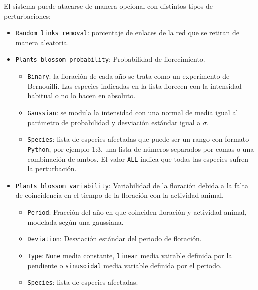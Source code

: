 El sistema puede atacarse de manera opcional con distintos tipos de perturbaciones:
\begin{itemize}
\item \texttt{Random links removal}: porcentaje de enlaces de la red que se retiran de manera aleatoria.

\item \texttt{Plants blossom probability}: Probabilidad de florecimiento. 

\begin{itemize}
	\item \texttt{Binary}: la floración de cada año se trata como un experimento de Bernouilli. Las especies indicadas en la lista florecen con la intensidad habitual o no lo hacen en absoluto.

    \item \texttt{Gaussian}: se modula la intensidad con una normal de media igual al parámetro de probabilidad y desviación estándar igual a $\sigma$.
    
    \item \texttt{Species}: lista de especies afectadas que puede ser un rango con formato \texttt{Python}, por ejemplo 1:3, una lista de números separados por comas o una combinación de ambos. El valor \texttt{ALL} indica que todas las especies sufren la perturbación.
\end{itemize}

\item \texttt{Plants blossom variability}: Variabilidad de la floración debida a la falta de coincidencia en el tiempo de la floración con la actividad animal.
\begin{itemize}
	\item \texttt{Period}: Fracción del año en que coinciden floración y actividad animal, modelada según una gaussiana.

    \item \texttt{Deviation}: Desviación estándar del periodo de floración.
    
    \item \texttt{Type}:  \texttt{None} media constante, \texttt{linear} media vairable definida por la pendiente o \texttt{sinusoidal} media variable definida por el periodo.
    
    \item \texttt{Species}: lista de especies afectadas.
\end{itemize}

\end{itemize}


